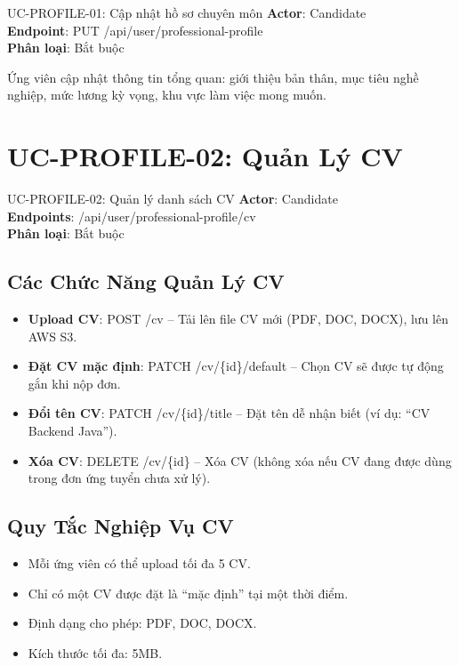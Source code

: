 \documentclass[12pt, a4paper]{report}
\begin{document}
\begin{requirementbox}{UC-PROFILE-01: Cập nhật hồ sơ chuyên môn}
\textbf{Actor}: Candidate \\
\textbf{Endpoint}: PUT /api/user/professional-profile \\
\textbf{Phân loại}: Bắt buộc
\end{requirementbox}

Ứng viên cập nhật thông tin tổng quan: giới thiệu bản thân, mục tiêu nghề nghiệp, mức lương kỳ vọng, khu vực làm việc mong muốn.

\section{UC-PROFILE-02: Quản Lý CV}

\begin{requirementbox}{UC-PROFILE-02: Quản lý danh sách CV}
\textbf{Actor}: Candidate \\
\textbf{Endpoints}: /api/user/professional-profile/cv \\
\textbf{Phân loại}: Bắt buộc
\end{requirementbox}

\subsection{Các Chức Năng Quản Lý CV}

\begin{itemize}
    \item \textbf{Upload CV}: POST /cv -- Tải lên file CV mới (PDF, DOC, DOCX), lưu lên AWS S3.
    \item \textbf{Đặt CV mặc định}: PATCH /cv/\{id\}/default -- Chọn CV sẽ được tự động gắn khi nộp đơn.
    \item \textbf{Đổi tên CV}: PATCH /cv/\{id\}/title -- Đặt tên dễ nhận biết (ví dụ: ``CV Backend Java'').
    \item \textbf{Xóa CV}: DELETE /cv/\{id\} -- Xóa CV (không xóa nếu CV đang được dùng trong đơn ứng tuyển chưa xử lý).
\end{itemize}

\subsection{Quy Tắc Nghiệp Vụ CV}

\begin{itemize}
    \item Mỗi ứng viên có thể upload tối đa 5 CV.
    \item Chỉ có một CV được đặt là ``mặc định'' tại một thời điểm.
    \item Định dạng cho phép: PDF, DOC, DOCX.
    \item Kích thước tối đa: 5MB.
\end{itemize}
\end{document}
